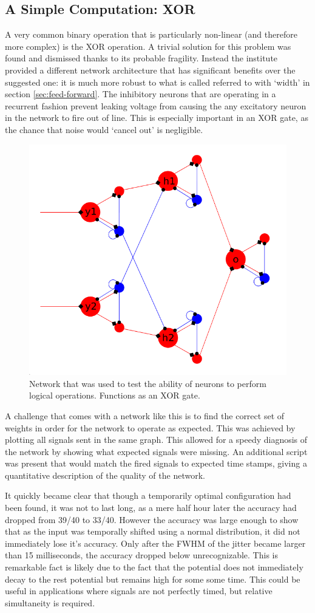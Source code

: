 \documentclass[a4paper,twocolumn]{article}
\begin{document}
\subsection{A Simple Computation: XOR}
A very common binary operation that is particularly non-linear (and therefore
more complex) is the XOR operation\cite{horowitz_hill_2020}.  A trivial solution
for this problem was found and dismissed thanks to its probable fragility.
Instead the institute provided a different network architecture that has
significant benefits over the suggested one: it is much more robust to what is
called referred to with `width' in section \ref{sec:feed-forward}. The
inhibitory neurons that are operating in a recurrent fashion prevent leaking
voltage from causing the any excitatory neuron in the network to fire out of
line. This is especially important in an XOR gate, as the chance that noise
would `cancel out' is negligible.

\begin{figure}
    \centering
    \includegraphics[width=.5\textwidth]{figures/XOR-used.png}
    \caption{Network that was used to test the ability of neurons to perform
        logical operations. Functions as an XOR gate.}
    \label{fig:XOR-used}
\end{figure}

A challenge that comes with a network like this is to find the correct set of
weights in order for the network to operate as expected. This was achieved by
plotting all signals sent in the same graph. This allowed for a speedy diagnosis
of the network by showing what expected signals were missing. An additional
script was present that would match the fired signals to expected time stamps,
giving a quantitative description of the quality of the network.

It quickly became clear that though a temporarily optimal configuration had been
found, it was not to last long, as a mere half hour later the accuracy had
dropped from 39/40 to 33/40. However the accuracy was large enough to show that
as the input was temporally shifted using a normal distribution, it did not
immediately lose it's accuracy. Only after the FWHM of the jitter became larger
than 15 milliseconds, the accuracy dropped below unrecognizable. This is
remarkable fact is likely due to the fact that the potential does not
immediately decay to the rest potential but remains high for some some time.
This could be useful in applications where signals are not perfectly timed, but
relative simultaneity is required.
\end{document}
